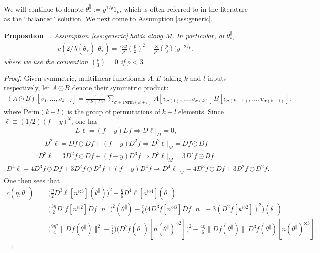\documentclass{article}
\newcommand{\tpa}{\theta^{\parallel}}
\theoremstyle{plain}
\newtheorem{proposition}[theorem]{Proposition}
\theoremstyle{definition}
\theoremstyle{remark}
\begin{document}
We will continue to denote $\tpa_*:=y^{1/p}1_p$, which is often referred to in the literature as the ``balanced" solution. We next come to Assumption \ref{ass:generic}.

\begin{proposition}\label{prop:generic}
   Assumption \ref{ass:generic} holds along $M$. In particular, at $\tpa_*$,
   \begin{align}
       c(2/\lambda(\tpa_*),\tpa_*) = \bigg(\frac{32}{p^3}\binom{p}{2}^2 - \frac{8}{p^2}\binom{p}{3}\bigg)y^{-2/p},
   \end{align}
   where we use the convention $\binom{p}{3} = 0$ if $p <3$.
\end{proposition}

\begin{proof}
    Given symmetric, multilinear functionals $A,B$ taking $k$ and $l$ inputs respectively, let $A\odot B$ denote their symmetric product:
    \begin{align}
        (A\odot B)[v_1,\dots,v_{k+l}] = \frac{1}{(k+l)!}\sum_{\sigma\in\text{Perm}(k+l)}A[v_{\sigma(1)},\dots,v_{\sigma(k)}]B[v_{\sigma(k+1)},\dots,v_{\sigma(k+l)}],
    \end{align}
    where $\text{Perm}(k+l)$ is the group of permutations of $k+l$ elements. Since $\ell \equiv (1/2)(f-y)^2$, one has
    \begin{align}
        D\ell = (f-y)Df\Rightarrow D\ell|_M = 0,
    \end{align}
    \begin{align}
        D^2\ell = Df\odot Df + (f-y)D^2f\Rightarrow D^2\ell|_M = Df\odot Df
    \end{align}
    \begin{align}
        D^3\ell = 3D^2f\odot Df + (f-y)D^3f\Rightarrow D^3\ell|_M = 3D^2f\odot Df
    \end{align}
    \begin{align}
        D^4\ell = 4D^3f\odot Df + 3D^2f\odot D^2f + (f-y)D^4f\Rightarrow D^4\ell|_M = 4D^3f\odot Df + 3D^2f\odot D^2f.
    \end{align}
    One then sees that
    \begin{align}
        c(\eta,\tpa) &= \bigg(\frac{\eta}{2}D^3\ell[n^{\otimes 3}](\tpa)\bigg)^2 - \frac{\eta}{6}D^4\ell[n^{\otimes4}](\tpa)\\&=\bigg(\frac{3\eta}{2}D^2f[n^{\otimes 2}]Df[n]\bigg)^2(\tpa) - \frac{\eta}{6}\bigg(4D^3f[n^{\otimes 3}]Df[n] + 3(D^2f[n^{\otimes2}])^2\bigg)(\tpa)\\&=\bigg(\frac{9\eta^2}{4}\|Df(\tpa)\|^2-\frac{\eta}{2}\bigg)\big(D^2f(\tpa)[n(\tpa)^{\otimes 2}]\big)^2 - \frac{4\eta}{6}\|Df(\tpa)\|\,D^3f(\tpa)[n(\tpa)^{\otimes 3}].

\end{align}
\end{proof}
\end{document}
